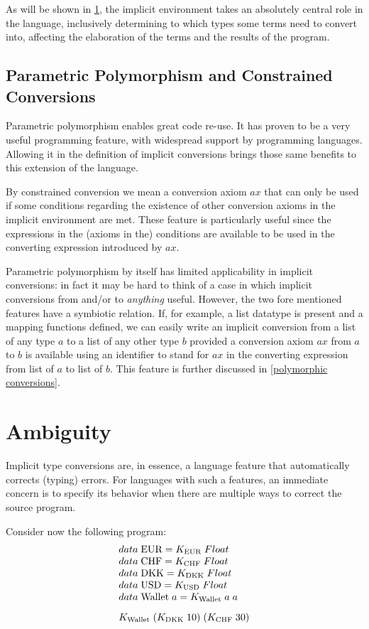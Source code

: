 As will be shown in \ref{ambiguity}, the implicit environment takes an absolutely central role in the language, inclusively determining to which types some terms need to convert into, affecting the elaboration of the terms and the results of the program.

\subsection{Parametric Polymorphism and Constrained Conversions}
Parametric polymorphism enables great code re-use. It has proven to be a very useful programming feature, with widespread support by programming languages. Allowing it in the definition of implicit conversions brings those same benefits to this extension of the language.

By constrained conversion we mean a conversion axiom $ax$ that can only be used if some conditions regarding the existence of other conversion axioms in the implicit environment are met. These feature is particularly useful since the expressions in the (axioms in the) conditions are available to be used in the converting expression introduced by $ax$.

Parametric polymorphism by itself has limited applicability in implicit conversions: in fact it may be hard to think of a case in which implicit conversions from and/or to \textit{anything} useful. However, the two fore mentioned features have a symbiotic relation. If, for example, a list datatype is present and a mapping functions defined, we can easily write an implicit conversion from a list of any type $a$ to a list of any other type $b$ provided a conversion axiom $ax$ from $a$ to $b$ is available using an identifier to stand for $ax$ in the converting expression from list of $a$ to list of $b$. This feature is further discussed in \ref{polymorphic conversions}.



\section{Ambiguity}
\label{ambiguity}
Implicit type conversions are, in essence, a language feature that automatically corrects (typing) errors. For languages with such a features, an immediate concern is to specify its behavior when there are multiple ways to correct the source program. 

Consider now the following program:
\[
\begin{array}{@{\hspace{0mm}}l@{\hspace{0mm}}}
data\;\text{EUR}=K_{\text{EUR}}\;Float\\
data\;\text{CHF}=K_{\text{CHF}}\;Float\\
data\;\text{DKK}=K_{\text{DKK}}\;Float\\
data\;\text{USD}=K_{\text{USD}}\;Float\\
data\;\text{Wallet}\;a = K_{\text{Wallet}} \;a \;a\\[3mm]
K_{\text{Wallet}}\;(K_{\text{DKK}}\;10)\;(K_{\text{CHF}}\;30)
\end{array}
\]

